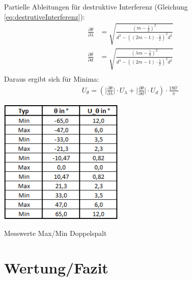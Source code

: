 \documentclass[a4paper]{scrartcl}
\numberwithin{equation}{subsection}
\begin{document}
Partielle Ableitungen für destruktive Interferenz (Gleichung \ref{eq:destrutiveInterferenz}):
\begin{align}
\frac{\partial \theta}{\partial \lambda} &= \sqrt{\frac{(m-\frac{1}{2})^2}{d^2-((2m-1)\cdot \frac{\lambda}{2})^2d^2}}\\
\frac{\partial \theta}{\partial d} &= \sqrt{\frac{(\lambda m-\frac{1}{2})^2}{d^4-((2m-1)\cdot \frac{\lambda}{2})^2d^2}}\\
\end{align}
Daraus ergibt sich für Minima:
\begin{align}
U_{\theta} = (\bigg | \frac{\partial \theta}{\partial \lambda} \bigg | \cdot U_{\lambda} + \bigg | \frac{\partial \theta}{\partial d} \bigg | \cdot U_d) \cdot \frac{180 ^\circ}{\pi}
\end{align}

\begin{table}[H]
\includegraphics[width=6cm]{Tabelle_maxmin_theoretisch}
\centering
\caption{Messwerte Max/Min Doppelspalt}
\centering
\label{tab:MesswerteMaxMinTheoretisch}
\end{table}


\newpage

\section{Wertung/Fazit}
\end{document}
